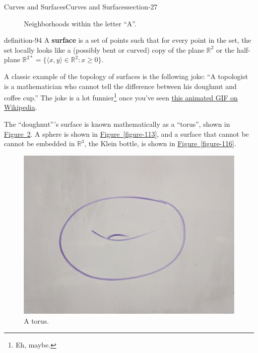 \documentclass[oneside,10pt,]{article}
\newcommand{\terminology}[1]{\textbf{#1}}
\newcommand{\tuple}[1]{\langle #1 \rangle}
\newcommand{\mb}{\mathbb}
\begin{document}
\begin{sectionptx}{Curves and Surfaces}{}{Curves and Surfaces}{}{}{section-27}
\begin{figure}
\caption{Neighborhoods within the letter ``A''.\label{figure-90}}
\end{figure}
\begin{definition}{}{definition-94}%
\hypertarget{p-95}{}%
A \terminology{surface} is a set of points such that for every point in the set, the set locally looks like a (possibly bent or curved) copy of the plane \(\mathbb R^2\) or the half-plane \(\mathbb R^{2*}=\{\tuple{x,y}\in\mb R^2:x\geq 0\}\).%
\end{definition}
\hypertarget{p-99}{}%
A classic example of the topology of surfaces is the following joke: ``A topologist is a mathematician who cannot tell the difference between his doughnut and coffee cup.'' The joke is a lot funnier\footnote{Eh, maybe.\label{fn-101}} once you've seen \href{https://en.wikipedia.org/wiki/File:Mug_and_Torus_morph.gif}{this animated GIF on Wikipedia}.%
\par
\hypertarget{p-103}{}%
The ``doughnut'''s surface is known mathematically as a ``torus'', shown in \hyperref[figure-110]{Figure~\ref{figure-110}}. A sphere is shown in \hyperref[figure-113]{Figure~\ref{figure-113}}, and a surface that cannot be cannot be embedded in \(\mathbb R^3\), the Klein bottle, is shown in \hyperref[figure-116]{Figure~\ref{figure-116}}.%
\begin{figure}
\centering
\includegraphics[width=1\linewidth]{images/torus.jpg}
\caption{A torus.\label{figure-110}}
\end{figure}
\begin{figure}
\centering

\end{figure}
\end{sectionptx}
\end{document}
